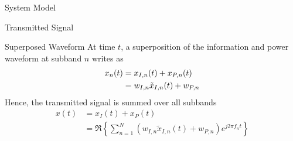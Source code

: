 \documentclass{IEEEtran}
\begin{document}
\begin{section} {System Model}
\begin{subsection}	{Transmitted Signal}
		\begin{subsubsection} {Superposed Waveform}
			At time $t$, a superposition of the information and power waveform at subband $n$ writes as
			\begin{equation}	\label{eq:x_{n}(t)}
				\begin{split}
					x_{n}(t)
					&= x_{I,n}(t)+x_{P,n}(t)	\\
					&= w_{I,n} \tilde{x}_{I,n}(t)+w_{P,n}
				\end{split}
			\end{equation}
			Hence, the transmitted signal is summed over all subbands
			\begin{equation}	\label{eq:x(t)}
				\begin{split}
					x(t)
					&= x_{I}(t)+x_{P}(t)	\\
					&= \Re \left\{ \sum_{n=1}^{N} (w_{I,n} \tilde{x}_{I,n}(t)+w_{P,n}) e^{j2 \pi f_n t} \right\}
				\end{split}
			\end{equation}
		\end{subsubsection}

	\end{subsection}


\end{section}
\end{document}
